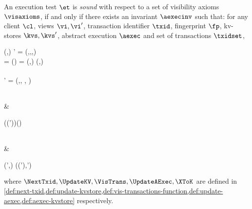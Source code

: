 \begin{definition}
\label{def:et-sound-constructor}
An execution test \(\et\) is \emph{sound} with respect to a set of visibility axioms \(\visaxioms\),
if and only if there exists an invariant \(\aexecinv\) such that:
for any client \( \cl \), views \( \vi, \vi' \), 
transaction identifier \( \txid \), fingerprint \( \fp \), kv-stores \( \kvs, \kvs' \),
abstract execution \( \aexec \) and set of transactions \( \txidset \),
\begin{Formulae}
\MoveEqLeft \begin{Formula}
    \land \txid \in \NextTxid(\kvs,\cl)
    \land \kvs' = \UpdateKV(\kvs,\vi,\fp,\txid)
    \\ {} \land \kvs = \XToK(\aexec)
    \land \txidset = \VisTrans(\kvs,\vi)
    \land \aexecinv(\aexec,\cl) \subseteq \txidset
    \implies 
    \\ \txidsetrd \subseteq {}
    \\ {} \land \aexec' = \UpdateAExec(\aexec,\txidset \cup \txidsetrd, \fp, \txid)
\end{Formula} \nonumber
\\ & \begin{Formula}
    {} \land \Forall{\visaxiom \in \visaxioms }
            \Inv(\visaxiom(\aexec'))(\txid) \subseteq \txidset \cup \txidsetrd
\label{equ:et-to-visaxioms}
\end{Formula}
\\ & \begin{Formula}
    \land \aexecinv(\aexec',\cl) \subseteq \VisTrans(\XToK(\aexec'),\vi') 
\label{equ:aexecinv-preserve}
\end{Formula}
\end{Formulae}
where \( \NextTxid, \UpdateKV,\VisTrans,\UpdateAExec, \XToK \) are defined in \cref{def:next-txid,def:update-kvstore,def:vis-transactions-function,def:update-aexec,def:aexec-kvstore} respectively.
\end{definition} 

